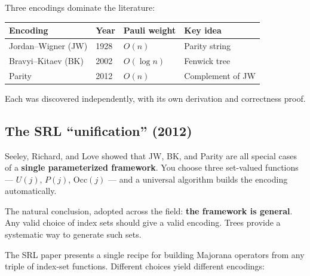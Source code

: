 \documentclass[11pt,a4paper]{article}
\newcommand{\Occ}[1]{\mathrm{Occ}(#1)}
\theoremstyle{definition}
\begin{document}
Three encodings dominate the literature:

\begin{center}
\begin{tabular}{@{}llll@{}}
\toprule
Encoding & Year & Pauli weight & Key idea \\
\midrule
Jordan--Wigner (JW) & 1928 & $O(n)$ & Parity string \\
Bravyi--Kitaev (BK) & 2002 & $O(\log n)$ & Fenwick tree \\
Parity & 2012 & $O(n)$ & Complement of JW \\
\bottomrule
\end{tabular}
\end{center}

Each was discovered independently, with its own derivation and
correctness proof.

\subsection{The SRL ``unification'' (2012)}

\begin{believed}
Seeley, Richard, and Love showed that JW, BK, and Parity are all
special cases of a \textbf{single parameterized framework}.  You
choose three set-valued functions --- $U(j)$, $P(j)$, $\Occ{j}$ ---
and a universal algorithm builds the encoding automatically.

\medskip

The natural conclusion, adopted across the field: \textbf{the framework
is general}.  Any valid choice of index sets should give a valid
encoding.  Trees provide a systematic way to generate such sets.
\end{believed}

The SRL paper presents a single recipe for building Majorana operators
from any triple of index-set functions.  Different choices yield
different encodings:
\end{document}
